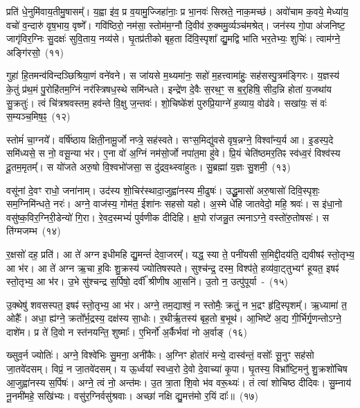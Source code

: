 प्रति॑ धे॒नुमि॑वाय॒तीमु॒षासम्᳚। य॒ह्वा इ॑व॒ प्र व॒यामु॒ज्जिहा॑नाः॒ प्र भा॒नवः॑ सिस्रते॒ नाक॒मच्छ॑। अवो॑चाम क॒वये॒ मेध्या॑य॒ वचो॑ व॒न्दारु॑ वृष॒भाय॒ वृष्णे᳚। गवि॑ष्ठिरो॒ नम॑सा॒ स्तोम॑म॒ग्नौ दि॒वीव॑ रु॒क्ममु॒र्व्यञ्च॑मश्रेत्। जन॑स्य गो॒पा अ॑जनिष्ट॒ जागृ॑विर॒ग्निः सु॒दक्षः॑ सुवि॒ताय॒ नव्य॑से। घृ॒तप्र॑तीको बृह॒ता दि॑वि॒स्पृशा᳚ द्यु॒मद्वि भा॑ति भर॒तेभ्यः॒ शुचिः॑। त्वाम॑ग्ने॒ अङ्गि॑रसो॒~(११)\ip

गुहा॑ हि॒तमन्व॑विन्दञ्छिश्रिया॒णं वने॑वने। स जा॑यसे म॒थ्यमा॑नः॒ सहो॑ म॒हत्त्वामा॑हुः॒ सह॑सस्पु॒त्रम॑ङ्गिरः। य॒ज्ञस्य॑ के॒तुं प्र॑थ॒मं पु॒रोहि॑तम॒ग्निं नर॑स्त्रिषध॒स्थे समि॑न्धते। इन्द्रे॑ण दे॒वैः स॒रथ॒ꣳ॒ स ब॒र्॒\mbox{}हिषि॒ सीद॒न्नि होता॑ य॒जथा॑य सु॒क्रतुः॑। त्वं चि॑त्रश्रवस्तम॒ हव॑न्ते वि॒क्षु ज॒न्तवः॑। शो॒चिष्के॑शं पुरुप्रि॒याग्ने॑ ह॒व्याय॒ वोढ॑वे। सखा॑यः॒ सं वः॑ स॒म्यञ्च॒मिष॒ꣴ॒~(१२)\ip

स्तोमं॑ चा॒ग्नये᳚। वर्\mbox{}षि॑ष्ठाय क्षिती॒नामू॒र्जो नप्त्रे॒ सह॑स्वते। सꣳस॒मिद्यु॑वसे वृष॒न्नग्ने॒ विश्वा᳚न्य॒र्य आ। इ॒डस्प॒दे समि॑ध्यसे॒ स नो॒ वसू॒न्या भ॑र। ए॒ना वो॑ अ॒ग्निं नम॑सो॒र्जो नपा॑त॒मा हु॑वे। प्रि॒यं चेति॑ष्ठमर॒तिꣴ स्व॑ध्व॒रं विश्व॑स्य दू॒तम॒मृतम्᳚। स यो॑जते अरु॒षो वि॒श्वभो॑जसा॒ स दु॑द्रव॒थ्\-स्वा॑हुतः। सु॒ब्रह्मा॑ य॒ज्ञः सु॒शमी॒~(१३)\ip

वसू॑नां दे॒वꣳ राधो॒ जना॑नाम्। उद॑स्य शो॒चिर॑स्थादा॒जुह्वा॑नस्य मी॒ढुषः॑। उद्धू॒मासो॑ अरु॒षासो॑ दिवि॒स्पृशः॒ सम॒ग्निमि॑न्धते॒ नरः॑। अग्ने॒ वाज॑स्य॒ गोम॑त॒ ईशा॑नः सहसो यहो। अ॒स्मे धे॑हि जातवेदो॒ महि॒ श्रवः॑। स इ॑धा॒नो वसु॑ष्क॒विर॒ग्निरी॒डेन्यो॑ गि॒रा। रे॒वद॒स्मभ्यं॑ पुर्वणीक दीदिहि। क्ष॒पो रा॑जन्नु॒त त्मनाऽग्ने॒ वस्तो॑रु॒तोषसः॑। स ति॑ग्मजम्भ~(१४)\ip

र॒क्षसो॑ दह॒ प्रति॑। आ ते॑ अग्न इधीमहि द्यु॒मन्तं॑ देवा॒जरम्᳚। यद्ध॒ स्या ते॒ पनी॑यसी स॒मिद्दी॒दय॑ति॒ द्यवीषꣴ॑ स्तो॒तृभ्य॒ आ भ॑र। आ ते॑ अग्न ऋ॒चा ह॒विः शु॒क्रस्य॑ ज्योतिषस्पते। सुश्च॑न्द्र॒ दस्म॒ विश्प॑ते॒ हव्य॑वा॒ट्तुभ्यꣳ॑ हूयत॒ इषꣴ॑ स्तो॒तृभ्य॒ आ भ॑र। उ॒भे सु॑श्चन्द्र स॒र्पिषो॒ दर्वी᳚ श्रीणीष आ॒सनि॑। उ॒तो न॒ उत्पु॑पूर्या~-~(१५)\ip

उ॒क्थेषु॑ शवसस्पत॒ इषꣴ॑ स्तो॒तृभ्य॒ आ भ॑र। अग्ने॒ तम॒द्याश्वं॒ न स्तोमैः॒ क्रतुं॒ न भ॒द्रꣳ हृ॑दि॒स्पृशम्᳚। ऋ॒ध्यामा॑ त॒ ओहैः᳚। अधा॒ ह्य॑ग्ने॒ क्रतो᳚र्भ॒द्रस्य॒ दक्ष॑स्य सा॒धोः। र॒थीर्\mbox{}ऋ॒तस्य॑ बृह॒तो ब॒भूथ॑। आ॒भिष्टे॑ अ॒द्य गी॒र्भिर्गृ॒णन्तो\-ऽग्ने॒ दाशे॑म। प्र ते॑ दि॒वो न स्त॑नयन्ति॒ शुष्माः᳚। ए॒भिर्नो॑ अ॒र्कैर्भवा॑ नो अ॒र्वाङ्~(१६)\ip

ख्सुव॒र्न ज्योतिः॑। अग्ने॒ विश्वे॑भिः सु॒मना॒ अनी॑कैः। अ॒ग्निꣳ होता॑रं मन्ये॒ दास्व॑न्तं॒ वसोः᳚ सू॒नुꣳ सह॑सो जा॒तवे॑दसम्। विप्रं॒ न जा॒तवे॑दसम्। य ऊ॒र्ध्वया᳚ स्वध्व॒रो दे॒वो दे॒वाच्या॑ कृ॒पा। घृ॒तस्य॒ विभ्रा᳚ष्टि॒मनु॑ शु॒क्रशो॑चिष आ॒जुह्वा॑नस्य स॒र्पिषः॑। अग्ने॒ त्वं नो॒ अन्त॑मः। उ॒त त्रा॒ता शि॒वो भ॑व वरू॒थ्यः॑। तं त्वा॑ शोचिष्ठ दीदिवः। सु॒म्नाय॑ नू॒नमी॑महे॒ सखि॑भ्यः। वसु॑र॒ग्निर्वसु॑श्रवाः। अच्छा॑ नक्षि द्यु॒मत्त॑मो र॒यिं दाः᳚॥~(१७)\ip

